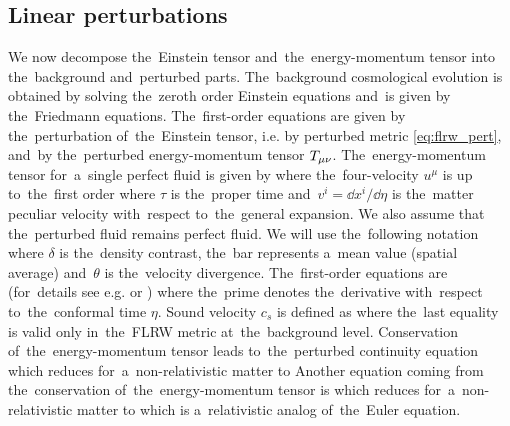 \subsection{Linear perturbations}
We now decompose the~Einstein tensor and~the~energy-momentum tensor into the~background and~perturbed parts. The~background cosmological evolution is obtained by solving the~zeroth order Einstein equations and~is given by the~Friedmann equations. The~first-order equations are given by the~perturbation of~the~Einstein tensor, i.e. by perturbed metric \eqref{eq:flrw_pert}, and~by the~perturbed energy-momentum tensor $T_{\mu\nu}$. The~energy-momentum tensor for~a~single perfect fluid is given by
where the~four-velocity $u^\mu$ is up to~the~first order
where $\tau$ is the~proper time and~$v^i=\dd x^i/\dd\eta$ is the~matter peculiar velocity with~respect to~the~general expansion. We also assume that the~perturbed fluid remains perfect fluid. We will use the~following notation
where $\delta$ is the~density contrast, the~bar represents a~mean value (spatial average) and~$\theta$ is the~velocity divergence. The~first-order equations are (for~details see e.g. \cite{2002col.luc..cosmology} or \cite{10.1143/PTPS.78.1})
where the~prime denotes the~derivative with~respect to~the~conformal time $\eta$. Sound velocity $c_s$ is defined as
where the~last equality is valid only in~the~FLRW metric at~the~background level. Conservation of~the~energy-momentum tensor leads to~the~perturbed continuity equation
which reduces for~a~non-relativistic matter to
Another equation coming from the~conservation of~the~energy-momentum tensor is
which reduces for~a~non-relativistic matter to
which is a~relativistic analog of~the~Euler equation.


